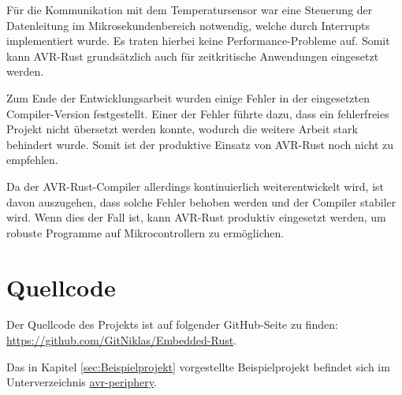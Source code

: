 \documentclass
[ 12pt,
  parskip=half %
]{scrreprt}
\begin{document}
Für die Kommunikation mit dem Temperatursensor war eine Steuerung der Datenleitung im Mikrosekundenbereich notwendig, welche durch Interrupts implementiert wurde. Es traten hierbei keine Performance-Probleme auf. Somit kann AVR-Rust grundsätzlich auch für zeitkritische Anwendungen eingesetzt werden.

Zum Ende der Entwicklungsarbeit wurden einige Fehler in der eingesetzten Compiler-Version festgestellt. Einer der Fehler führte dazu, dass ein fehlerfreies Projekt nicht übersetzt werden konnte, wodurch die weitere Arbeit stark behindert wurde. Somit ist der produktive Einsatz von AVR-Rust noch nicht zu empfehlen.

Da der AVR-Rust-Compiler allerdings kontinuierlich weiterentwickelt wird, ist davon auszugehen, dass solche Fehler behoben werden und der Compiler stabiler wird. Wenn dies der Fall ist, kann AVR-Rust produktiv eingesetzt werden, um robuste Programme auf Mikrocontrollern zu ermöglichen.

\chapter{Quellcode}

Der Quellcode des Projekts ist auf folgender GitHub-Seite zu finden: \\ \url{https://github.com/GitNiklas/Embedded-Rust}.

Das in Kapitel \ref{sec:Beispielprojekt} vorgestellte Beispielprojekt befindet sich im Unterverzeichnis \href{https://github.com/GitNiklas/Embedded-Rust/tree/master/src/avr_periphery}{avr-periphery}.


\nocite{*} %
\end{document}
